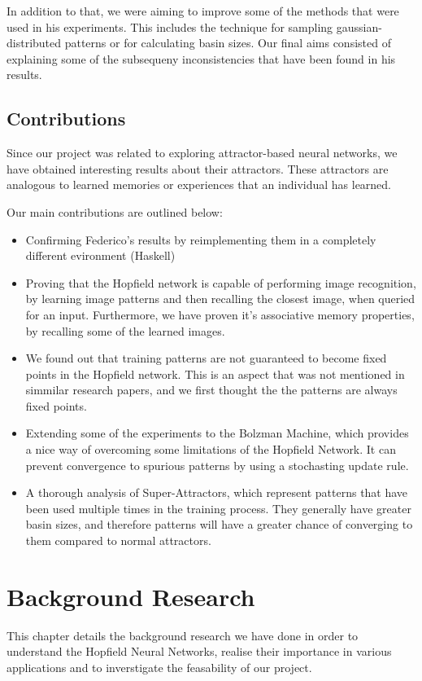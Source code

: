 \documentclass[11pt,a4paper,oneside]{report}
\begin{document}
In addition to that, we were aiming to improve some of the methods that were used in his experiments. This includes the technique for sampling gaussian-distributed patterns or for calculating basin sizes. Our final aims consisted of explaining some of the subsequeny inconsistencies that have been found in his results. 

\section{Contributions}

Since our project was related to exploring attractor-based neural networks, we have obtained interesting results about their attractors. These attractors are analogous to learned memories or experiences that an individual has learned. 


Our main contributions are outlined below:
\begin{itemize}
\item Confirming Federico's results by reimplementing them in a completely different evironment (Haskell)
\item Proving that the Hopfield network is capable of performing image recognition, by learning image patterns and then recalling the closest image, when queried for an input. Furthermore, we have proven it's associative memory properties, by recalling some of the learned images. 
\item We found out that training patterns are not guaranteed to become fixed points in the Hopfield network. This is an aspect that was not mentioned in simmilar research papers, and we first thought the the patterns are always fixed points.
\item Extending some of the experiments to the Bolzman Machine, which provides a nice way of overcoming some limitations of the Hopfield Network. It can prevent convergence to spurious patterns by using a stochasting update rule. 
\item A thorough analysis of Super-Attractors, which represent patterns that have been used multiple times in the training process. They generally have greater basin sizes, and therefore patterns will have a greater chance of converging to them compared to normal attractors. 
\end{itemize}

\chapter{Background Research}
This chapter details the background research we have done in order to understand the Hopfield Neural Networks, realise their importance in various applications and to inverstigate the feasability of our project. 
\end{document}
